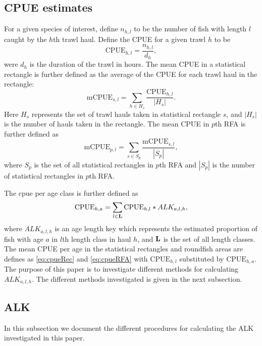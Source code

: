 \documentclass[a4paper 12pt]{article}
\numberwithin{equation}{section}
\begin{document}
\subsection{CPUE estimates}
For a given species of interest, define $n_{h,l}$ to be the number of fish with length $l$ caught by the $h$th trawl haul. Define the CPUE for a given trawl $h$ to be 
\begin{equation}\label{eq:cpueHaul}
\mathrm{CPUE}_{h,l} =\frac{n_{h,l}}{d_h},
\end{equation}
were $d_h$ is the duration of the trawl in hours. The mean CPUE in a statistical rectangle is further defined as the average of the CPUE for each trawl haul in the rectangle:
\begin{equation}\label{eq:cpueRec}
\mathrm{mCPUE}_{s,l} =\sum_{h \in H_{s}}\frac{\mathrm{CPUE}_{h,l}}{|H_{s}|}.
\end{equation}
Here $H_{s}$ represents the set of trawl hauls taken in statistical rectangle $s$, and $|H_{s}|$ is the number of hauls taken in the rectangle. The mean CPUE in $p$th RFA is further defined as
\begin{equation}\label{eq:cpueRFA}
\mathrm{mCPUE}_{p,l} = \sum_{s \in S_{p}} \frac{\mathrm{mCPUE}_{s,l}}{|S_{p}|} ,
\end{equation}
where $S_{p}$ is the set of all statistical rectangles in $p$th RFA and $|S_{p}|$ is the number of statistical rectangles in $p$th RFA. 


The cpue per age class is further defined as
\begin{equation}\label{eq:cpueALK}
\mathrm{CPUE}_{h,a} =\sum_{l \in {\bf L}}\mathrm{CPUE}_{h,l}*ALK_{a,l,h},
\end{equation}
where $ALK_{a,l,h}$ is an age length key which represents the estimated proportion of fish with age $a$ in $l$th length class in haul $h$, and ${\bf L}$ is the set of all length classes. The mean CPUE per age in the statistical rectangles and roundfish areas are defines as \ref{eq:cpueRec} and \ref{eq:cpueRFA} with $\mathrm{CPUE}_{h,l}$ substituted by $\mathrm{CPUE}_{h,a}$. The purpose of this paper is to investigate different methods for calculating $ALK_{a,l,h}$. The different methods investigated is given in the next subsection.

\subsection*{ALK}
In this subsection we document the different procedures for calculating the ALK investigated in this paper.
\end{document}
